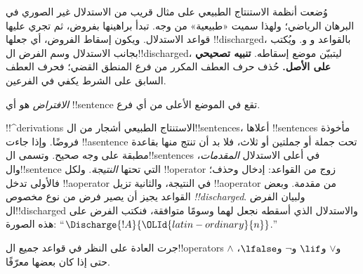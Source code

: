 \documentclass[../../../include/open-logic-section]{subfiles}
\begin{document}
      {}
      {}


\begin{explain}
وُضعت أنظمة الاستنتاج الطبيعي على مثال قريب من الاستدلال غير الصوري في البرهان الرياضي؛ ولهذا سميت «طبيعية» من وجه.
تبدأ براهينها بفروض، ثم تجري عليها قواعد الاستدلال.
ويكون إسقاط الفروض، أي جعلها !!{discharged}، بالقواعد
\Intro{\lnot} و\Intro{\lif} و.
ويُكتب بجانب الاستدلال وسم الفرض ال!!{discharged}، ليتبيّن موضع إسقاطه.
\textbf{تنبيه تصحيحي على الأصل.} حُذف حرف العطف المكرر من فرع المنطق
القضي؛ فحرف العطف السابق على الشرط يكفي في الفرعين.
\end{explain}

\begin{defn}[الافتراض]
\emph{الافتراض} هو أي !!{sentence} تقع في الموضع الأعلى من أي فرع.
\end{defn}

!!^{derivation}s الاستنتاج الطبيعي أشجار من ال!!{sentence}s، أعلاها
!!{sentence}s مأخوذة فروضًا. وإذا جاءت !!a{sentence} تحت جملة أو جملتين أو ثلاث، فلا بد أن تنتج منها بقاعدة مطبقة على وجه صحيح.
وتسمى ال!!{sentence}s في أعلى الاستدلال \emph{المقدمات}، وال!!{sentence} التي تحتها \emph{النتيجة}.
ولكل !!{operator} زوج من القواعد: إدخال وحذف؛ فالأولى تدخل
!!a{operator} في النتيجة، والثانية تزيل !!a{operator} من مقدمة.
وبعض القواعد يجيز أن يصير فرض من نوع مخصوص \emph{!!{discharged}}.
ولبيان الفرض ال!!{discharged} والاستدلال الذي أسقطه نجعل لهما وسومًا متوافقة، فنكتب الفرض على هذه الصورة:
``$\Discharge{!A}{\OLId{latin-ordinary}{n}}$.''


%
	{جرت العادة على النظر في قواعد جميع ال!!{operator}s $\land$ و$\lor$ و$\lif$ و$\lnot$ و$\lfalse$، حتى إذا كان بعضها معرّفًا.}
\end{document}

